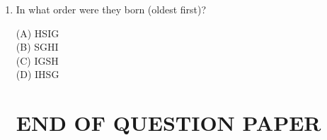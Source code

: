 \documentclass[journal,12pt,onecolumn]{IEEEtran}
\theoremstyle{remark}
\begin{document}
\begin{enumerate}
\noindent \item  In what order were they born (oldest first)?

\hfill{}

\begin{multicols}{2}
\noindent(A) HSIG\\
(B) SGHI\\
(C) IGSH\\
(D) IHSG
\end{multicols}

\begin{center}
\section*{END OF QUESTION PAPER}
\end{center}

\end{enumerate}
\end{document}
